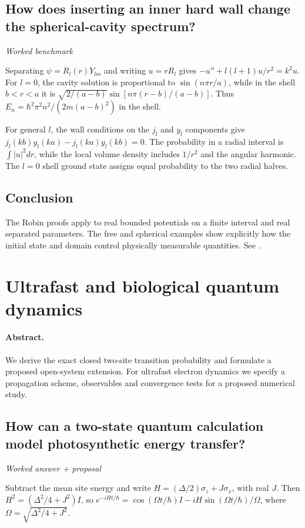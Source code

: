 \documentclass[11pt]{article}
\begin{document}
\subsection{How does inserting an inner hard wall change the spherical-cavity spectrum?}
\label{problem:spherical-shell}
\textit{Worked benchmark}

Separating \(\psi=R_l(r)Y_{lm}\) and writing \(u=rR_l\) gives \(-u''+l(l+1)u/r^2=k^2u\). For \(l=0\), the cavity solution is proportional to \(\sin(n\pi r/a)\), while in the shell \(b<r<a\) it is \(\sqrt{2/(a-b)}\sin[n\pi(r-b)/(a-b)]\). Thus \(E_n=\hbar^2\pi^2n^2/(2m(a-b)^2)\) in the shell.

For general \(l\), the wall conditions on the \(j_l\) and \(y_l\) components give \(j_l(kb)y_l(ka)-j_l(ka)y_l(kb)=0\). The probability in a radial interval is \(\int|u|^2dr\), while the local volume density includes \(1/r^2\) and the angular harmonic. The \(l=0\) shell ground state assigns equal probability to the two radial halves.

\subsection*{Conclusion}
The Robin proofs apply to real bounded potentials on a finite interval and real separated parameters. The free and spherical examples show explicitly how the initial state and domain control physically measurable quantities.
See \cite{ref4}.

\section{Ultrafast and biological quantum dynamics}
\paragraph{Abstract.} We derive the exact closed two-site transition probability and formulate a proposed open-system extension. For ultrafast electron dynamics we specify a propagation scheme, observables and convergence tests for a proposed numerical study.

\subsection{How can a two-state quantum calculation model photosynthetic energy transfer?}
\label{problem:photosynthesis}
\textit{Worked answer + proposal}

Subtract the mean site energy and write \(H=(\Delta/2)\sigma_z+J\sigma_x\), with real \(J\). Then \(H^2=(\Delta^2/4+J^2)I\), so \(e^{-iHt/\hbar}=\cos(\Omega t/\hbar)I-iH\sin(\Omega t/\hbar)/\Omega\), where \(\Omega=\sqrt{\Delta^2/4+J^2}\).
\end{document}
